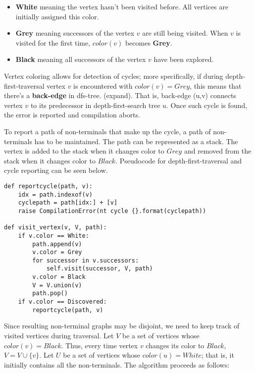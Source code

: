 \begin{itemize}
\item

\textbf{White} meaning the vertex hasn't been visited before. All vertices are initially assigned this color.

\item
\textbf{Grey} meaning successors of the vertex $v$ are still being visited. When $v$ is visited for the first time, $color(v)$ becomes \textbf{Grey}.
\item
\textbf{Black} meaning all successors of the vertex $v$ have been explored. 
\end{itemize}



Vertex coloring allows for detection of cycles; more specifically, if during depth-first-traversal vertex $v$ is encountered with $color(v)=Grey$, this means that there's a \textbf{back-edge} in dfs-tree. (expand). That is, back-edge (u,v) connects vertex $v$ to its predecessor in depth-first-search tree $u$. Once such cycle is found, the error is reported and compilation aborts.

To report a path of non-terminals that make up the cycle, a path of non-terminals has to be maintained. The path can be represented as a stack. The vertex is added to the stack when it changes color to $Grey$ and removed from the stack when it changes color to $Black$. Pseudocode for depth-first-traversal and cycle reporting can be seen below.


\begin{verbatim}
def reportcycle(path, v):
	idx = path.indexof(v)
	cyclepath = path[idx:] + [v]
	raise CompilationError(nt cycle {}.format(cyclepath))

def visit_vertex(v, V, path):
	if v.color == White:
		path.append(v)
		v.color = Grey 
		for successor in v.successors:
			self.visit(successor, V, path)
		v.color = Black
		V = V.union(v)
		path.pop()
	if v.color == Discovered:
		reportcycle(path, v)
\end{verbatim}

Since resulting non-terminal graphs may be disjoint, we need to keep track of visited vertices during traversal. Let $V$ be a set of vertices whose $color(v)=Black$. Thus, every time vertex $v$ changes its color to $Black$, $V = V \cup \{v\} $. Let $U$ be a set of vertices whose $color(u)=White$; that is, it initially contains all the non-terminals. The algorithm proceeds as follows:

